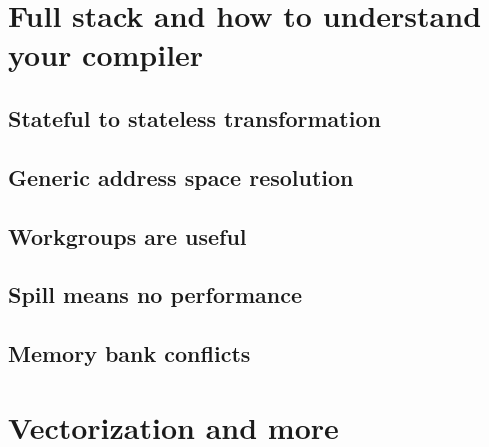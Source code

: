 \documentclass[a4paper,12pt,oneside]{article}
\begin{document}
\section{Full stack and how to understand your compiler}\label{sec:Compiler}


\subsection{Stateful to stateless transformation}\label{subsec:ToStateless}


\subsection{Generic address space resolution}\label{subsec:GenAddr}


\subsection{Workgroups are useful}\label{subsec:Wgroups}


\subsection{Spill means no performance}\label{subsec:Spills}


\subsection{Memory bank conflicts}\label{subsec:Banks}


\section{Vectorization and more}\label{sec:Vectors}

\end{document}
